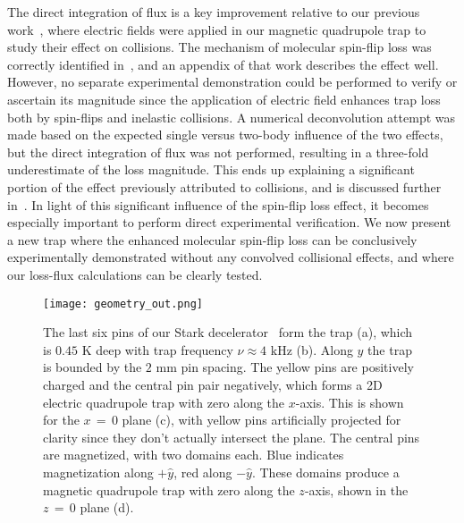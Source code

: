 \documentclass[%
 reprint,
 amsmath,amssymb,
 aps,
prl,
]{revtex4-1}
\begin{document}
The direct integration of flux is a key improvement relative to our previous work~\cite{Stuhl2013}, where electric fields were applied in our magnetic quadrupole trap to study their effect on collisions.
The mechanism of molecular spin-flip loss was correctly identified in~\cite{Stuhl2013}, and an appendix of that work describes the effect well. 
However, no separate experimental demonstration could be performed to verify or ascertain its magnitude since the application of electric field enhances trap loss both by spin-flips and inelastic collisions.
A numerical deconvolution attempt was made based on the expected single versus two-body influence of the two effects, but the direct integration of flux was not performed, resulting in a three-fold underestimate of the loss magnitude.
This ends up explaining a significant portion of the effect previously attributed to collisions, and is discussed further in~\cite{ssm}.
In light of this significant influence of the spin-flip loss effect, it becomes especially important to perform direct experimental verification.
We now present a new trap where the enhanced molecular spin-flip loss can be conclusively experimentally demonstrated without any convolved collisional effects, and where our loss-flux calculations can be clearly tested.





\begin{figure}[tb]
\texttt{[image: geometry\_out.png]}%
\caption{
The last six pins of our Stark decelerator~\cite{Sawyer2008} form the trap (a), which is $0.45\text{ K}$ deep with trap frequency $\nu\approx4\text{ kHz}$ (b). 
Along $y$ the trap is bounded by the $2\text{ mm}$ pin spacing. 
The yellow pins are positively charged and the central pin pair negatively, which forms a 2D electric quadrupole trap with zero along the $x$-axis. 
This is shown for the $x\,{=}\,0$ plane (c), with yellow pins artificially projected for clarity since they don't actually intersect the plane. 
The central pins are magnetized, with two domains each. 
Blue indicates magnetization along $+\hat{y}$, red along $-\hat{y}$. 
These domains produce a magnetic quadrupole trap with zero along the $z$-axis, shown in the $z\,{=}\,0$ plane (d). 
\label{fig:CAD}}
\end{figure}

\end{document}
